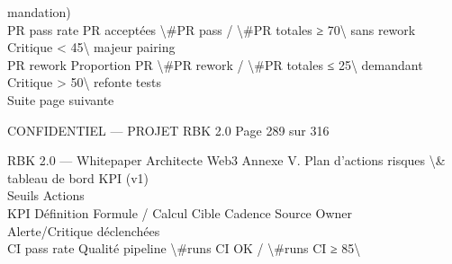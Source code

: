 \documentclass[12pt,landscape,a4paper]{article}
\newenvironment{confidential}
{\begin{tcolorbox}[
    colback=rbkred!5!white,
    colframe=rbkred!75!black,
    title=CONFIDENTIEL,
    fonttitle=\bfseries\color{white},
    coltitle=rbkred!75!black,
    breakable,
    enhanced,
    frame hidden,
    borderline west={2pt}{0pt}{rbkred!75!black}
]}
{\end{tcolorbox}}
\begin{document}
mandation)\\
PR pass rate   PR acceptées       \textbackslash{}#PR pass / \textbackslash{}#PR totales       ≥ 70\textbackslash{}%
sans rework                                                                            Critique \textless{} 45\textbackslash{}%
majeur                                                                                                       pairing\\
PR rework      Proportion PR      \textbackslash{}#PR rework / \textbackslash{}#PR totales ≤ 25\textbackslash{}%
demandant                                                                              Critique \textgreater{} 50\textbackslash{}%
refonte                                                                                                      tests\\
Suite page suivante\\
\vspace{0.5em}
\vspace{0.5em}
\vspace{0.5em}
\vspace{0.5em}
\begin{confidential}CONFIDENTIEL — PROJET RBK 2.0                                                 Page 289 sur 316\end{confidential}
RBK 2.0 — Whitepaper Architecte Web3                                                                        Annexe V. Plan d’actions risques \textbackslash{}& tableau de bord KPI (v1)\\
\vspace{0.5em}
\vspace{0.5em}
Seuils                    Actions\\
KPI            Définition         Formule / Calcul           Cible      Cadence    Source     Owner\\
Alerte/Critique           déclenchées\\
CI pass rate   Qualité pipeline   \textbackslash{}#runs CI OK / \textbackslash{}#runs CI     ≥ 85\textbackslash{}%
\end{document}
